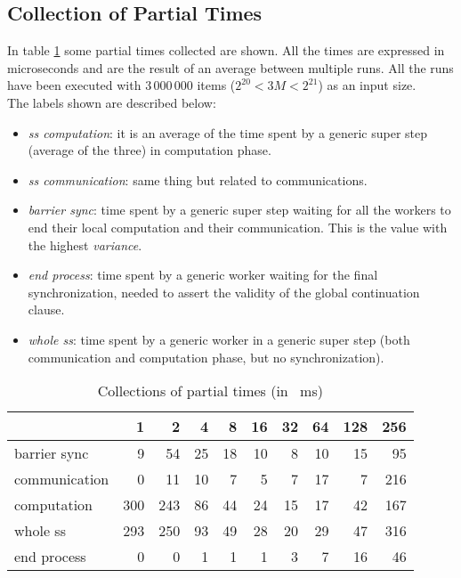 \documentclass[]{article}
\begin{document}
\subsection{Collection of Partial Times}
\label{sec:tseq}
In table \ref{tab:tseq} some partial times collected are shown. All the times are expressed in microseconds and are the result of an average between multiple runs. All the runs have been executed with $3\,000\,000$ items ($2^{20} < 3M < 2^{21}$) as an input size.\\ 
The labels shown are described below:
\begin{itemize}
	\item \emph{ss computation}: it is an average of the time spent by a generic super step (average of the three) in computation phase.
	\item \emph{ss communication}: same thing but related to communications.
	\item \emph{barrier sync}: time spent by a generic super step waiting for all the workers to end their local computation and their communication. This is the value with the highest \emph{variance}.
	\item \emph{end process}: time spent by a generic worker waiting for the final synchronization, needed to assert the validity of the global continuation clause.
	\item \emph{whole ss}: time spent by a generic worker in a generic super step (both communication and computation phase, but no synchronization).
\end{itemize}
\begin{table}[H]
	\centering
	\begin{tabular}{l|*{9}r}
		\toprule
		\diagbox{phase}{$\mathit{nw}$} 
		& 1 & 2 & 4 & 8 & 16 & 32 & 64 & 128 & 256 \\
		\midrule
		barrier sync & 9 & 54 & 25 & 18 & 10 & 8 & 10 & 15 & 95 \\
		communication & 0 & 11 & 10 & 7 & 5 & 7 & 17 & 7 & 216 \\
		computation & 300 & 243 & 86 & 44 & 24 & 15 & 17 & 42 & 167 \\
		whole ss & 293 & 250 & 93 & 49 & 28 & 20 & 29 & 47 & 316 \\
		end process & 0 & 0 & 1 & 1 & 1 & 3 & 7 & 16 & 46 \\
		\bottomrule
	\end{tabular}%
	\caption{Collections of partial times (in \SI{}{\milli \second})}
	\label{tab:tseq}%
\end{table}%
\end{document}
